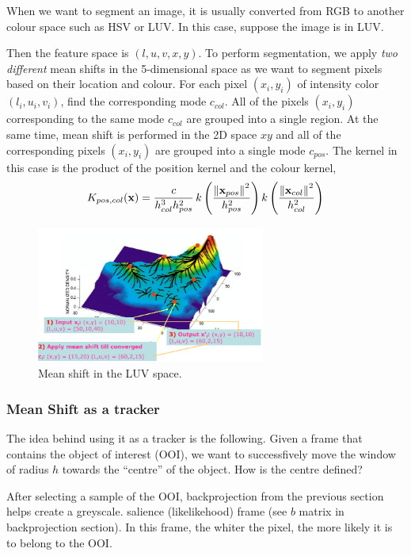 \documentclass[a4paper]{article}
\begin{document}
When we want to segment an image, it is usually converted from RGB to another colour space such as HSV or LUV. In this case, suppose the image is in LUV.

Then the feature space is $(l, u, v, x, y)$. To perform segmentation, we apply \textit{two different} mean shifts in the 5-dimensional space as we want to segment pixels based on their location and colour. For each pixel $(x_i,y_i)$ of intensity color $(l_i, u_i, v_i)$, find the corresponding mode $c_{col}$. All of the pixels $(x_i,y_i)$  corresponding to the same
mode $c_{col}$ are grouped into a single region. At the same time, mean shift is performed in the 2D space $xy$ and all of the corresponding pixels $(x_i,y_i)$ are grouped into a single mode $c_{pos}$. The kernel in this case is the product of the position kernel and the colour kernel,
\begin{equation}
    K_{pos,col}(\textbf{x}) = \frac{c}{h_{col}^3 h_{pos}^2}\,
    k\left(\frac{\left\lVert\textbf{x}_{pos}\right\rVert^2}{h_{pos}^2} \right)
    k\left(\frac{\left\lVert\textbf{x}_{col}\right\rVert^2}{h_{col}^2} \right)
\end{equation}
\begin{figure}[H]
    \centering
    \includegraphics[height=4.5cm]{img/mean_shift/mean_shift_5d.PNG}
    \caption{Mean shift in the LUV space.}
\end{figure}

\subsubsection{Mean Shift as a tracker}


The idea behind using it as a tracker is the following. Given a frame that contains the object of interest (OOI), we want to successfively move the window of radius $h$ towards the ``centre'' of the object. How is the centre defined?

After selecting a sample of the OOI, backprojection from the previous section helps create a greyscale. salience (likelikehood) frame (see $b$ matrix in backprojection section). In this frame, the whiter the pixel, the more likely it is to belong to the OOI.
\end{document}

